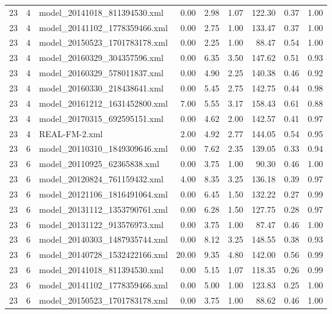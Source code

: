 \begin{table}[ht]
\begin{tabular}{rrlrrrrrr}
   23 &   4 & model\_20141018\_811394530.xml & 0.00 & 2.98 & 1.07 & 122.30 & 0.37 & 1.00 \\ 
   23 &   4 & model\_20141102\_1778359466.xml & 0.00 & 2.75 & 1.00 & 133.47 & 0.37 & 1.00 \\ 
   23 &   4 & model\_20150523\_1701783178.xml & 0.00 & 2.25 & 1.00 & 88.47 & 0.54 & 1.00 \\ 
   23 &   4 & model\_20160329\_304357596.xml & 0.00 & 6.35 & 3.50 & 147.62 & 0.51 & 0.93 \\ 
   23 &   4 & model\_20160329\_578011837.xml & 0.00 & 4.90 & 2.25 & 140.38 & 0.46 & 0.92 \\ 
   23 &   4 & model\_20160330\_218438641.xml & 0.00 & 5.45 & 2.75 & 142.75 & 0.44 & 0.98 \\ 
   23 &   4 & model\_20161212\_1631452800.xml & 7.00 & 5.55 & 3.17 & 158.43 & 0.61 & 0.88 \\ 
   23 &   4 & model\_20170315\_692595151.xml & 0.00 & 4.62 & 2.00 & 142.57 & 0.41 & 0.97 \\ 
   23 &   4 & REAL-FM-2.xml & 2.00 & 4.92 & 2.77 & 144.05 & 0.54 & 0.95 \\ 
   23 &   6 & model\_20110310\_1849309646.xml & 0.00 & 7.62 & 2.35 & 139.05 & 0.33 & 0.94 \\ 
   23 &   6 & model\_20110925\_62365838.xml & 0.00 & 3.75 & 1.00 & 90.30 & 0.46 & 1.00 \\ 
   23 &   6 & model\_20120824\_761159432.xml & 4.00 & 8.35 & 3.25 & 136.18 & 0.39 & 0.97 \\ 
   23 &   6 & model\_20121106\_1816491064.xml & 0.00 & 6.45 & 1.50 & 132.22 & 0.27 & 0.99 \\ 
   23 &   6 & model\_20131112\_1353790761.xml & 0.00 & 6.28 & 1.50 & 127.75 & 0.28 & 0.97 \\ 
   23 &   6 & model\_20131122\_913576973.xml & 0.00 & 3.75 & 1.00 & 87.47 & 0.46 & 1.00 \\ 
   23 &   6 & model\_20140303\_1487935744.xml & 0.00 & 8.12 & 3.25 & 148.55 & 0.38 & 0.93 \\ 
   23 &   6 & model\_20140728\_1532422166.xml & 20.00 & 9.35 & 4.80 & 142.00 & 0.56 & 0.99 \\ 
   23 &   6 & model\_20141018\_811394530.xml & 0.00 & 5.15 & 1.07 & 118.35 & 0.26 & 0.99 \\ 
   23 &   6 & model\_20141102\_1778359466.xml & 0.00 & 5.00 & 1.00 & 123.83 & 0.25 & 1.00 \\ 
   23 &   6 & model\_20150523\_1701783178.xml & 0.00 & 3.75 & 1.00 & 88.62 & 0.46 & 1.00 \\ 

\end{tabular}
\end{table}
